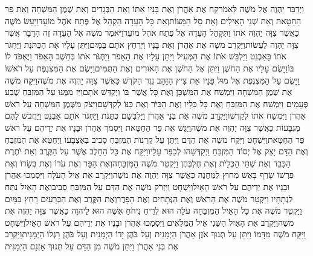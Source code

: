 \documentclass[../main/main.tex]{subfiles}
\begin{document}
\begin{multicols*}{\ncols}
וַיְדַבֵּר יַהְוֶה אֶל מֹשֶׁה לֵּאמֹר\PreVerseSpace{}קַח אֶת אַהֲרֹן וְאֶת בָּנָיו אִתּוֹ וְאֵת הַבְּגָדִים וְאֵת שֶׁמֶן הַמִּשְׁחָה וְאֵת פַּר הַחַטָּאת וְאֵת שְׁנֵי הָאֵילִים וְאֵת סַל הַמַּצּוֹת\PreVerseSpace{}וְאֵת כָּל הָעֵדָה הַקְהֵל אֶל פֶּתַח אֹהֶל מוֹעֵד\PreVerseSpace{}וַיַּעַשׂ מֹשֶׁה כַּאֲשֶׁר צִוָּה יַהְוֶה אֹתוֹ וַתִּקָּהֵל הָעֵדָה אֶל פֶּתַח אֹהֶל מוֹעֵד\PreVerseSpace{}וַיֹּאמֶר מֹשֶׁה אֶל הָעֵדָה זֶה הַדָּבָר אֲשֶׁר צִוָּה יַהְוֶה לַעֲשׂוֹת\PreVerseSpace{}וַיַּקְרֵב מֹשֶׁה אֶת אַהֲרֹן וְאֶת בָּנָיו וַיִּרְחַץ אֹתָם בַּמָּיִם\PreVerseSpace{}וַיִּתֵּן עָלָיו אֶת הַכֻּתֹּנֶת וַיַּחְגֹּר אֹתוֹ בָּאַבְנֵט וַיַּלְבֵּשׁ אֹתוֹ אֶת הַמְּעִיל וַיִּתֵּן עָלָיו אֶת הָאֵפֹד וַיַּחְגֹּר אֹתוֹ בְּחֵשֶׁב הָאֵפֹד וַיֶּאְפֹּד לוֹ בּוֹ\PreVerseSpace{}וַיָּשֶׂם עָלָיו אֶת הַחֹשֶׁן וַיִּתֵּן אֶל הַחֹשֶׁן אֶת הָאוּרִים וְאֶת הַתֻּמִּים\PreVerseSpace{}וַיָּשֶׂם אֶת הַמִּצְנֶפֶת עַל רֹאשׁוֹ וַיָּשֶׂם עַל הַמִּצְנֶפֶת אֶל מוּל פָּנָיו אֵת צִיץ הַזָּהָב נֵזֶר הַקֹּדֶשׁ כַּאֲשֶׁר צִוָּה יַהְוֶה אֶת מֹשֶׁה\PreVerseSpace{}וַיִּקַּח מֹשֶׁה אֶת שֶׁמֶן הַמִּשְׁחָה וַיִּמְשַׁח אֶת הַמִּשְׁכָּן וְאֶת כָּל אֲשֶׁר בּוֹ וַיְקַדֵּשׁ אֹתָם\PreVerseSpace{}וַיַּז מִמֶּנּוּ עַל הַמִּזְבֵּחַ שֶׁבַע פְּעָמִים וַיִּמְשַׁח אֶת הַמִּזְבֵּחַ וְאֶת כָּל כֵּלָיו וְאֶת הַכִּיֹּר וְאֶת כַּנּוֹ לְקַדְּשָׁם\PreVerseSpace{}וַיִּצֹק מִשֶּׁמֶן הַמִּשְׁחָה עַל רֹאשׁ אַהֲרֹן וַיִּמְשַׁח אֹתוֹ לְקַדְּשׁוֹ\PreVerseSpace{}וַיַּקְרֵב מֹשֶׁה אֶת בְּנֵי אַהֲרֹן וַיַּלְבִּשֵׁם כֻּתֳּנֹת וַיַּחְגֹּר אֹתָם אַבְנֵט וַיַּחֲבֹשׁ לָהֶם מִגְבָּעוֹת כַּאֲשֶׁר צִוָּה יַהְוֶה אֶת מֹשֶׁה\PreVerseSpace{}וַיַּגֵּשׁ אֵת פַּר הַחַטָּאת וַיִּסְמֹךְ אַהֲרֹן וּבָנָיו אֶת יְדֵיהֶם עַל רֹאשׁ פַּר הַחַטָּאת\PreVerseSpace{}וַיִּשְׁחָט וַיִּקַּח מֹשֶׁה אֶת הַדָּם וַיִּתֵּן עַל קַרְנוֹת הַמִּזְבֵּחַ סָבִיב בְּאֶצְבָּעוֹ וַיְחַטֵּא אֶת הַמִּזְבֵּחַ וְאֶת הַדָּם יָצַק אֶל יְסוֹד הַמִּזְבֵּחַ וַיְקַדְּשֵׁהוּ לְכַפֵּר עָלָיו\PreVerseSpace{}וַיִּקַּח אֶת כָּל הַחֵלֶב אֲשֶׁר עַל הַקֶּרֶב וְאֵת יֹתֶרֶת הַכָּבֵד וְאֶת שְׁתֵּי הַכְּלָיֹת וְאֶת חֶלְבְּהֶן וַיַּקְטֵר מֹשֶׁה הַמִּזְבֵּחָה\PreVerseSpace{}וְאֶת הַפָּר וְאֶת עֹרוֹ וְאֶת בְּשָׂרוֹ וְאֶת פִּרְשׁוֹ שָׂרַף בָּאֵשׁ מִחוּץ לַמַּחֲנֶה כַּאֲשֶׁר צִוָּה יַהְוֶה אֶת מֹשֶׁה\PreVerseSpace{}וַיַּקְרֵב אֵת אֵיל הָעֹלָה וַיִּסְמְכוּ אַהֲרֹן וּבָנָיו אֶת יְדֵיהֶם עַל רֹאשׁ הָאָיִל\PreVerseSpace{}וַיִּשְׁחָט וַיִּזְרֹק מֹשֶׁה אֶת הַדָּם עַל הַמִּזְבֵּחַ סָבִיב\PreVerseSpace{}וְאֶת הָאַיִל נִתַּח לִנְתָחָיו וַיַּקְטֵר מֹשֶׁה אֶת הָרֹאשׁ וְאֶת הַנְּתָחִים וְאֶת הַפָּדֶר\PreVerseSpace{}וְאֶת הַקֶּרֶב וְאֶת הַכְּרָעַיִם רָחַץ בַּמָּיִם וַיַּקְטֵר מֹשֶׁה אֶת כָּל הָאַיִל הַמִּזְבֵּחָה עֹלָה הוּא לְרֵיחַ נִיחֹחַ אִשֶּׁה הוּא לַיהוָה כַּאֲשֶׁר צִוָּה יַהְוֶה אֶת מֹשֶׁה\PreVerseSpace{}וַיַּקְרֵב אֶת הָאַיִל הַשֵּׁנִי אֵיל הַמִּלֻּאִים וַיִּסְמְכוּ אַהֲרֹן וּבָנָיו אֶת יְדֵיהֶם עַל רֹאשׁ הָאָיִל\PreVerseSpace{}וַיִּשְׁחָט וַיִּקַּח מֹשֶׁה מִדָּמוֹ וַיִּתֵּן עַל תְּנוּךְ אֹזֶן אַהֲרֹן הַיְמָנִית וְעַל בֹּהֶן יָדוֹ הַיְמָנִית וְעַל בֹּהֶן רַגְלוֹ הַיְמָנִית\PreVerseSpace{}וַיַּקְרֵב אֶת בְּנֵי אַהֲרֹן וַיִּתֵּן מֹשֶׁה מִן הַדָּם עַל תְּנוּךְ אָזְנָם הַיְמָנִית 
\end{multicols*}
\end{document}
